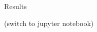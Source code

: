\begin{frame}[title-small={color=hpiorange, bg=none, text=Results}]
	\maketitle
\end{frame}


\begin{frame}{Results}
  \begin{minipage}{1.0\textwidth}
    (switch to jupyter notebook)
  \end{minipage}
\end{frame}
